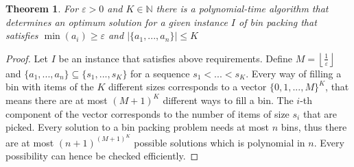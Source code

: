 \documentclass[a4paper, 12pt]{article}
\newtheorem{theorem}{Theorem}[section]
\begin{document}
	\begin{theorem}
		For $\varepsilon > 0$ and $K \in \mathbb{N}$ there is a polynomial-time algorithm that determines an optimum solution for a given instance $I$ of bin packing that satisfies $\min(a_i) \geq \varepsilon$ and $\left|\{a_1,...,a_n\}\right| \leq K$
	\end{theorem}
	\begin{proof}
		Let $I$ be an instance that satisfies above requirements. Define $M = \left\lfloor\frac{1}{\varepsilon}\right\rfloor$ and $\{a_1,...,a_n\} \subseteq \{s_1,...,s_K\}$ for a sequence $s_1 < ... < s_K$. Every way of filling a bin with items of the $K$ different sizes corresponds to a vector $\{0,1,...,M\}^K$, that means there are at most $(M+1)^K$ different ways to fill a bin. The $i$-th component of the vector corresponds to the number of items of size $s_i$ that are picked. Every solution to a bin packing problem needs at most $n$ bins, thus there are at most $(n+1)^{(M+1)^K}$ possible solutions which is polynomial in $n$. Every possibility can hence be checked efficiently.
	\end{proof}
\end{document}
